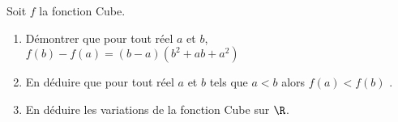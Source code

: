 
Soit $f$ la fonction Cube.
 \begin{enumerate}
 \item Démontrer que pour tout réel $a$ et $b$, $f(b)-f(a)=(b-a)(b^2+ab+a^2)$ 
 \item En déduire que pour tout réel $a$ et $b$ tels que $a<b$ alors $f(a)<f(b)$ .
  \item En déduire les variations de la fonction Cube sur $\R$.
 
 \end{enumerate}